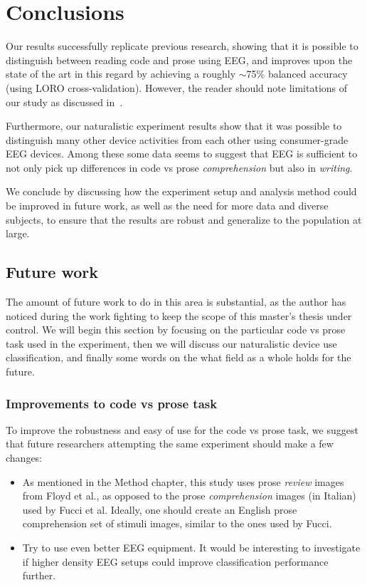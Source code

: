 \chapter{Conclusions}

Our results successfully replicate previous research, showing that it is possible to distinguish between reading code and prose using EEG, and improves upon the state of the art in this regard by achieving a roughly $\sim$75\% balanced accuracy (using LORO cross-validation). However, the reader should note limitations of our study as discussed in~.

Furthermore, our naturalistic experiment results show that it was possible to distinguish many other device activities from each other using consumer-grade EEG devices. Among these some data seems to suggest that EEG is sufficient to not only pick up differences in code vs prose \emph{comprehension} but also in \emph{writing}.

We conclude by discussing how the experiment setup and analysis method could be improved in future work, as well as the need for more data and diverse subjects, to ensure that the results are robust and generalize to the population at large.

\section{Future work}

The amount of future work to do in this area is substantial, as the author has noticed during the work fighting to keep the scope of this master's thesis under control. We will begin this section by focusing on the particular code vs prose task used in the experiment, then we will discuss our naturalistic device use classification, and finally some words on the what field as a whole holds for the future.

\subsection{Improvements to code vs prose task}

\begin{minipage}{\textwidth}
To improve the robustness and easy of use for the code vs prose task, we suggest that future researchers attempting the same experiment should make a few changes:

\begin{itemize}
    \item As mentioned in the Method chapter, this study uses prose \emph{review} images from Floyd et al., as opposed to the prose \emph{comprehension} images (in Italian) used by Fucci et al. Ideally, one should create an English prose comprehension set of stimuli images, similar to the ones used by Fucci.
    \item Try to use even better EEG equipment. It would be interesting to investigate if higher density EEG setups could improve classification performance further.
\end{itemize}
\end{minipage}


